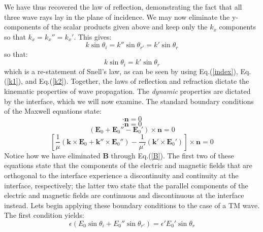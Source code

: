 \documentclass[preprint, onecolumn, amsmath, amssymb, aps]{revtex4-1}
\numberwithin{equation}{section}
\begin{document}
\noindent
We have thus recovered the law of reflection, demonstrating the fact that all three wave rays lay in the plane of incidence. We may now eliminate the y-components of the scalar products given above and keep only the $k_{x}$ components so that $k_{x} = k_{x}'' = k_{x}'$. This gives:
\begin{equation}
k \sin \theta_{i} = k'' \sin \theta_{r'} = k' \sin \theta_{r}
\end{equation}
\noindent
so that:
\begin{equation}\label{snell}
k \sin \theta_{i} = k' \sin \theta_{r}
\end{equation} 
\noindent
which is a re-statement of Snell's law, as can be seen by using Eq.(\ref{index}), Eq.(\ref{k1}), and Eq.(\ref{k2}). Together, the laws of reflection and refraction dictate the kinematic properties of wave propagation. The \textit{dynamic} properties are dictated by the interface, which we will now examine. The standard boundary conditions of the Maxwell equations state:
\begin{equation}
[ \epsilon (\mathbf{E}_{0} + \mathbf{E}_{0}'') - \epsilon' \mathbf{E}_{0}' ] \cdot \mathbf{n} = 0
\end{equation}
\begin{equation}
[ \mathbf{k} \times \mathbf{E}_{0} + \mathbf{k}'' \times \mathbf{E}_{0}'' - \mathbf{k}' \times \mathbf{E}_{0}' ] \cdot \mathbf{n} = 0
\end{equation}
\begin{equation}
(\mathbf{E}_{0} + \mathbf{E}_{0}'' - \mathbf{E}_{0}' ) \times \mathbf{n} = 0
\end{equation}
\begin{equation}
\left[ \frac{1}{\mu} ( \mathbf{k} \times \mathbf{E}_{0} + \mathbf{k}'' \times \mathbf{E}_{0}'' ) - \frac{1}{\mu'} ( \mathbf{k}' \times \mathbf{E}_{0}') \right] \times \mathbf{n} = 0
\end{equation}
\noindent
Notice how we have eliminated $\mathbf{B}$ through Eq.(\ref{B}). The first two of these equations state that the components of the electric and magnetic fields that are orthogonal to the interface experience a discontinuity and continuity at the interface, respectively; the latter two state that the parallel components of the electric and magnetic fields are continuous and discontinuous at the interface instead. Lets begin applying these boundary conditions to the case of a TM wave. The first condition yields:
\begin{equation}
\epsilon (E_{0} \sin \theta_{i} + E_{0}'' \sin \theta_{r'} ) = \epsilon' E_{0}' \sin \theta_{r}
\end{equation}
\end{document}
